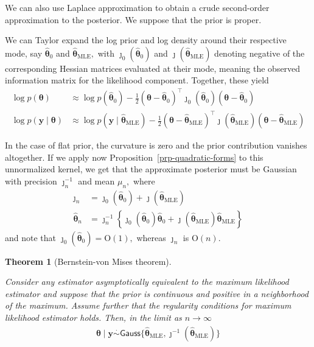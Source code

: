 \documentclass[
  11pt,
  letterpaper,
]{scrbook}
\theoremstyle{definition}
\theoremstyle{definition}
\theoremstyle{definition}
\theoremstyle{plain}
\theoremstyle{plain}
\newtheorem{theorem}{Theorem}[chapter]
\theoremstyle{plain}
\theoremstyle{remark}
\begin{document}
We can also use Laplace approximation to obtain a crude second-order
approximation to the posterior. We suppose that the prior is proper.

We can Taylor expand the log prior and log density around their
respective mode, say \(\widehat{\boldsymbol{\theta}}_0\) and
\(\widehat{\boldsymbol{\theta}}_{\mathrm{MLE}},\) with
\(\jmath_0(\widehat{\boldsymbol{\theta}}_0)\) and
\(\jmath(\widehat{\boldsymbol{\theta}}_{\mathrm{MLE}})\) denoting
negative of the corresponding Hessian matrices evaluated at their mode,
meaning the observed information matrix for the likelihood component.
Together, these yield \begin{align*}
\log p(\boldsymbol{\theta}) &\approx \log p(\widehat{\boldsymbol{\theta}}_0) - \frac{1}{2}(\boldsymbol{\theta} - \widehat{\boldsymbol{\theta}}_0)^\top\jmath_0(\widehat{\boldsymbol{\theta}}_0)(\boldsymbol{\theta} - \widehat{\boldsymbol{\theta}}_0)\\
\log p(\boldsymbol{y} \mid \boldsymbol{\theta}) &\approx \log p(\boldsymbol{y} \mid  \widehat{\boldsymbol{\theta}}_{\mathrm{MLE}}) - \frac{1}{2}(\boldsymbol{\theta} - \widehat{\boldsymbol{\theta}}_{\mathrm{MLE}})^\top\jmath(\widehat{\boldsymbol{\theta}}_{\mathrm{MLE}})(\boldsymbol{\theta} - \widehat{\boldsymbol{\theta}}_{\mathrm{MLE}})
\end{align*}

In the case of flat prior, the curvature is zero and the prior
contribution vanishes altogether. If we apply now
Proposition~\ref{prp-quadratic-forms} to this unnormalized kernel, we
get that the approximate posterior must be Gaussian with precision
\(\jmath_n^{-1}\) and mean \(\mu_n,\) where \begin{align*}
\jmath_n &= \jmath_0(\widehat{\boldsymbol{\theta}}_{0}) + \jmath(\widehat{\boldsymbol{\theta}}_{\mathrm{MLE}})\\
\widehat{\boldsymbol{\theta}}_n &= \jmath_n^{-1}\left\{ \jmath_0(\widehat{\boldsymbol{\theta}}_{0})\widehat{\boldsymbol{\theta}}_{0} + \jmath(\widehat{\boldsymbol{\theta}}_{\mathrm{MLE}})\widehat{\boldsymbol{\theta}}_{\mathrm{MLE}}\right\}
\end{align*} and note that
\(\jmath_0(\widehat{\boldsymbol{\theta}}_{0}) = \mathrm{O}(1),\) whereas
\(\jmath_n\) is \(\mathrm{O}(n).\)

\begin{theorem}[Bernstein-von Mises
theorem]\protect\hypertarget{thm-berstein-von-mises}{}\label{thm-berstein-von-mises}

Consider any estimator asymptotically equivalent to the maximum
likelihood estimator and suppose that the prior is continuous and
positive in a neighborhood of the maximum. Assume further that the
regularity conditions for maximum likelihood estimator holds. Then, in
the limit as \(n \to \infty\) \begin{align*}
\boldsymbol{\theta} \mid \boldsymbol{y} \stackrel{\cdot}{\sim} \mathsf{Gauss}\{ \widehat{\boldsymbol{\theta}}_{\mathrm{MLE}},  \jmath^{-1}(\widehat{\boldsymbol{\theta}}_{\mathrm{MLE}})\}
\end{align*}

\end{theorem}
\end{document}
